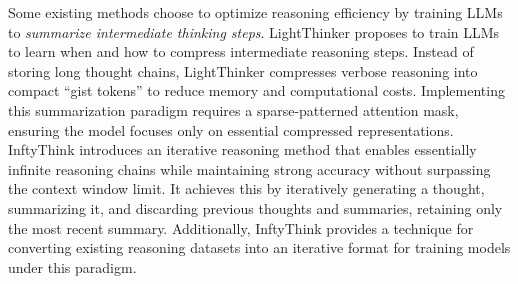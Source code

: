 Some existing methods choose to optimize reasoning efficiency by training LLMs to \textit{summarize intermediate thinking steps}.
%
LightThinker \cite{zhang2025lightthinker} proposes to train LLMs to learn when and how to compress intermediate reasoning steps. Instead of storing long thought chains, LightThinker compresses verbose reasoning into compact ``gist tokens'' to reduce memory and computational costs. Implementing this summarization paradigm requires a sparse-patterned attention mask, ensuring the model focuses only on essential compressed representations. 
%
InftyThink \cite{yan2025inftythink} introduces an iterative reasoning method that enables essentially infinite reasoning chains while maintaining strong accuracy without surpassing the context window limit. It achieves this by iteratively generating a thought, summarizing it, and discarding previous thoughts and summaries, retaining only the most recent summary. Additionally, InftyThink provides a technique for converting existing reasoning datasets into an iterative format for training models under this paradigm. 






